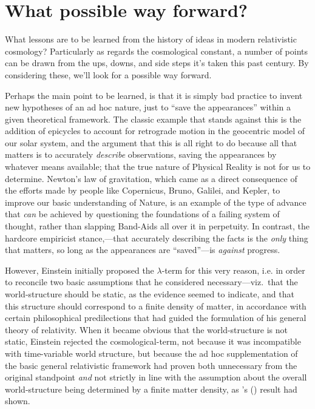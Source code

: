\documentclass[12 pt]{article}
\def\citeapos#1{\citeauthor{#1}'s (\citeyear{#1})}
\begin{document}
\section{What possible way forward?}
\label{sec:5}
What lessons are to be learned from the history of ideas in modern relativistic cosmology? Particularly as regards the cosmological constant, a number of points can be drawn from the ups, downs, and side steps it's taken this past century. By considering these, we'll look for a possible way forward.

Perhaps the main point to be learned, is that it is simply bad practice to invent new hypotheses of an ad hoc nature, just to ``save the appearances'' within a given theoretical framework. The classic example that stands against this is the addition of epicycles to account for retrograde motion in the geocentric model of our solar system, and the argument that this is all right to do because all that matters is to accurately \textit{describe} observations, saving the appearances by whatever means available; that the true nature of Physical Reality is not for us to determine. Newton's law of gravitation, which came as a direct consequence of the efforts made by people like Copernicus, Bruno, Galilei, and Kepler, to improve our basic understanding of Nature, is an example of the type of advance that \textit{can} be achieved by questioning the foundations of a failing system of thought, rather than slapping Band-Aids all over it in perpetuity. In contrast, the hardcore empiricist stance,---that accurately describing the facts is the \textit{only} thing that matters, so long as the appearances are ``saved''---is \textit{against} progress.

However, Einstein initially proposed the $\lambda$-term for this very reason, i.e. in order to reconcile two basic assumptions that he considered necessary---viz.\ that the world-structure should be static, as the evidence seemed to indicate, and that this structure should correspond to a finite density of matter, in accordance with certain philosophical predilections that had guided the formulation of his general theory of relativity. When it became obvious that the world-structure is not static, Einstein rejected the cosmological-term, not because it was incompatible with time-variable world structure, but because the ad hoc supplementation of the basic general relativistic framework had proven both unnecessary from the original standpoint \textit{and} not strictly in line with the assumption about the overall world-structure being determined by a finite matter density, as \citeapos{deSitter1917a} result had shown.
\end{document}
